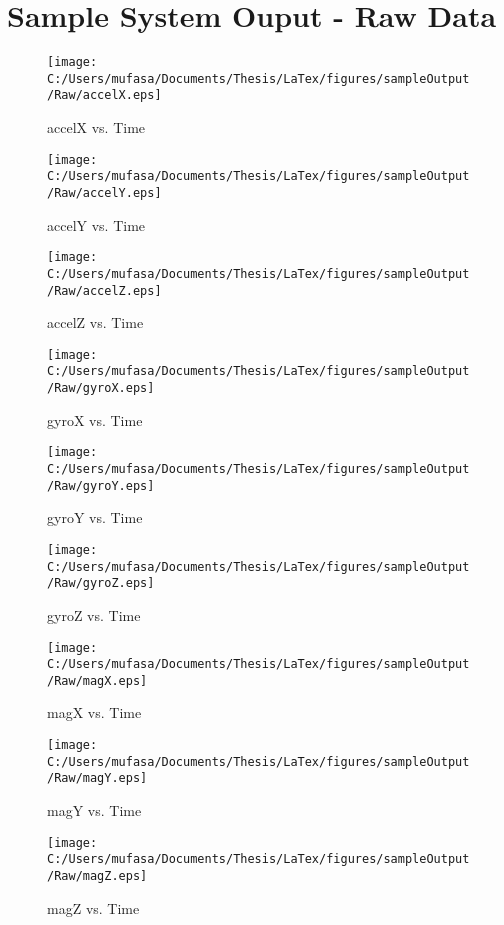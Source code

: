 \section{Sample System Ouput - Raw Data}
\begin{figure}[H]
	\centering
	\caption{accelX vs. Time}
		\texttt{[image: C:/Users/mufasa/Documents/Thesis/LaTex/figures/sampleOutput/Raw/accelX.eps]}
\end{figure}
\begin{figure}[H]
	\centering
	\caption{accelY vs. Time}
		\texttt{[image: C:/Users/mufasa/Documents/Thesis/LaTex/figures/sampleOutput/Raw/accelY.eps]}
\end{figure}
\begin{figure}[H]
	\centering
	\caption{accelZ vs. Time}
		\texttt{[image: C:/Users/mufasa/Documents/Thesis/LaTex/figures/sampleOutput/Raw/accelZ.eps]}
\end{figure}
\begin{figure}[H]
	\centering
	\caption{gyroX vs. Time}
		\texttt{[image: C:/Users/mufasa/Documents/Thesis/LaTex/figures/sampleOutput/Raw/gyroX.eps]}
\end{figure}
\begin{figure}[H]
	\centering
	\caption{gyroY vs. Time}
		\texttt{[image: C:/Users/mufasa/Documents/Thesis/LaTex/figures/sampleOutput/Raw/gyroY.eps]}
\end{figure}
\begin{figure}[H]
	\centering
	\caption{gyroZ vs. Time}
		\texttt{[image: C:/Users/mufasa/Documents/Thesis/LaTex/figures/sampleOutput/Raw/gyroZ.eps]}
\end{figure}
\begin{figure}[H]
	\centering
	\caption{magX vs. Time}
		\texttt{[image: C:/Users/mufasa/Documents/Thesis/LaTex/figures/sampleOutput/Raw/magX.eps]}
\end{figure}
\clearpage
\begin{figure}[H]
	\centering
	\caption{magY vs. Time}
		\texttt{[image: C:/Users/mufasa/Documents/Thesis/LaTex/figures/sampleOutput/Raw/magY.eps]}
\end{figure}
\begin{figure}[H]
	\centering
	\caption{magZ vs. Time}
		\texttt{[image: C:/Users/mufasa/Documents/Thesis/LaTex/figures/sampleOutput/Raw/magZ.eps]}
\end{figure}
